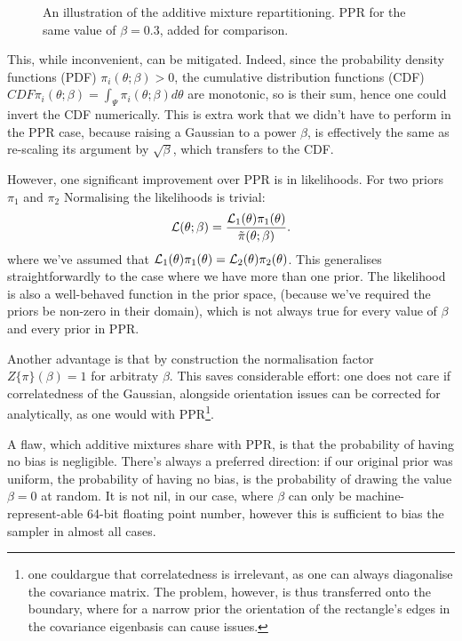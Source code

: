 \documentclass[usenatbib]{mnras}
\begin{document}
\begin{figure}
  
\caption{\label{org271e8d2}
An illustration of the additive mixture repartitioning. PPR for the same value of \(\beta=0.3\), added for comparison.}
\end{figure}

This, while inconvenient, can be mitigated. Indeed, since the
probability density functions (PDF) \(\pi_{i}(\theta; \beta) >0\),
the cumulative distribution functions (CDF)
\(CDF{\pi}_{i}(\theta;\beta) = \int_{\Psi} \pi_{i}(\theta; \beta)
	d\theta\) are monotonic, so is their sum, hence one could invert
the CDF numerically. This is extra work that we didn't have to
perform in the PPR case, because raising a Gaussian to a power
\(\beta\), is effectively the same as re-scaling its argument by
\(\sqrt{\beta}\), which transfers to the CDF.

However, one significant improvement over PPR is in
likelihoods. For two priors \(\pi_{1}\) and \(\pi_{2}\)
Normalising the likelihoods is trivial:
\begin{equation}
{\cal L}(\theta; \beta) = \frac{{\cal L}_{1}(\theta) \pi_{1}(\theta)}{\tilde{\pi}(\theta; \beta)}.
\end{equation}
where we've assumed that \({\cal L}_{1}(\theta)\pi_{1}(\theta)
	= {\cal L}_{2}(\theta) \pi_{2}(\theta)\). This generalises
straightforwardly to the case where we have more than one
prior. The likelihood is also a well-behaved function
in the prior space, (because we've required the priors be
non-zero in their domain), which is not always true for every
value of \(\beta\) and every prior in PPR.

Another advantage is that by construction the normalisation
factor \(Z \{ \pi\}(\beta) = 1\) for arbitraty \(\beta\). This
saves considerable effort: one does not care if correlatedness
of the Gaussian, alongside orientation issues can be corrected
for analytically, as one would with PPR\footnote{one couldargue
that correlatedness is irrelevant, as one can always
diagonalise the covariance matrix. The problem, however, is
thus transferred onto the boundary, where for a narrow prior
the orientation of the rectangle's edges in the covariance
eigenbasis can cause issues.}.

A flaw, which additive mixtures share with PPR, is that the
probability of having no bias is negligible. There's always a
preferred direction: if our original prior was uniform, the
probability of having no bias, is the probability of drawing the
value \(\beta=0\) at random. It is not nil, in our case, where
\(\beta\) can only be machine-represent-able 64-bit floating point
number, however this is sufficient to bias the sampler in almost
all cases.
\end{document}

